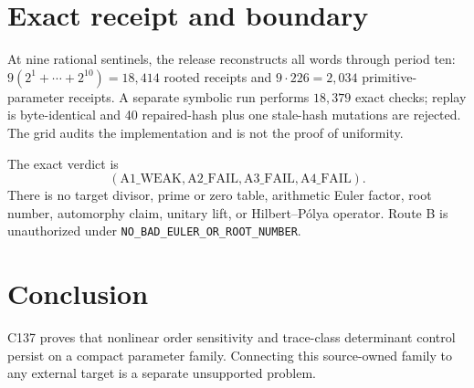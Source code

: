 \documentclass[11pt]{article}
\begin{document}
\section{Exact receipt and boundary}
At nine rational sentinels, the release reconstructs all words through
period ten: $9(2^1+\cdots+2^{10})=18{,}414$ rooted receipts and
$9\cdot226=2{,}034$ primitive-parameter receipts.  A separate symbolic run
performs $18{,}379$ exact checks; replay is byte-identical and 40
repaired-hash plus one stale-hash mutations are rejected.  The grid audits
the implementation and is not the proof of uniformity.

The exact verdict is
\[
 (\mathrm{A1\_WEAK},\mathrm{A2\_FAIL},\mathrm{A3\_FAIL},
 \mathrm{A4\_FAIL}).
\]
There is no target divisor, prime or zero table, arithmetic Euler factor,
root number, automorphy claim, unitary lift, or Hilbert--P\'olya operator.
Route B is unauthorized under
\texttt{NO\_BAD\_EULER\_OR\_ROOT\_NUMBER}.

\section{Conclusion}
C137 proves that nonlinear order sensitivity and trace-class determinant
control persist on a compact parameter family.  Connecting this source-owned
family to any external target is a separate unsupported problem.
\end{document}
